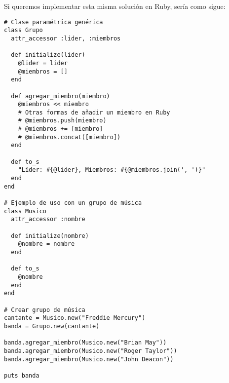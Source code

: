 \documentclass[a4paper,12pt]{article}
\begin{document}
Si queremos implementar esta misma solución en Ruby, sería como sigue:

\begin{lstlisting}[style=customrb]
# Clase paramétrica genérica
class Grupo
  attr_accessor :lider, :miembros

  def initialize(lider)
    @lider = lider
    @miembros = []
  end

  def agregar_miembro(miembro)
    @miembros << miembro
    # Otras formas de añadir un miembro en Ruby
    # @miembros.push(miembro)
    # @miembros += [miembro]
    # @miembros.concat([miembro])
  end

  def to_s
    "Líder: #{@lider}, Miembros: #{@miembros.join(', ')}"
  end
end

# Ejemplo de uso con un grupo de música
class Musico
  attr_accessor :nombre

  def initialize(nombre)
    @nombre = nombre
  end

  def to_s
    @nombre
  end
end

# Crear grupo de música
cantante = Musico.new("Freddie Mercury")
banda = Grupo.new(cantante)

banda.agregar_miembro(Musico.new("Brian May"))
banda.agregar_miembro(Musico.new("Roger Taylor"))
banda.agregar_miembro(Musico.new("John Deacon"))

puts banda
\end{lstlisting}



    
    
    
\end{document}
